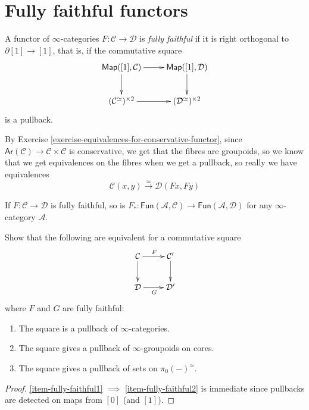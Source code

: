 \section{Fully faithful functors}
\label{section-fully-faithful-functors}

\begin{definition}
\label{definition-fully-faithful}
A functor of $\infty$-categories $F:\mathcal{C} \to \mathcal{D}$ 
is {\it fully faithful} if it is
right orthogonal to $\partial[1] \to [1]$,
that is, if the commutative square
$$
\xymatrix{
\mathsf{Map}([1],\mathcal{C})\ar[r]\ar[d]&
\mathsf{Map}([1],\mathcal{D})\ar[d]\\
(\mathcal{C}^\simeq)^{\times 2}\ar[r]&
(\mathcal{D}^\simeq)^{\times 2}
}
$$
is a pullback.
\end{definition}

By Exercise \ref{exercise-equivalences-for-conservative-functor}, since 
$\mathsf{Ar}(\mathcal{C})\to \mathcal{C}\times\mathcal{C}$
is conservative, we get that the fibres
are groupoids, so we know that we get equivalences
on the fibres when we get a pullback, so really we have
equivalences
$$
\mathcal{C}(x,y)\xrightarrow{\simeq}\mathcal{D}(Fx,Fy)
$$


\begin{lemma}
\label{lemma-fully-faithfulness-is-preserved-by-Fun(A,-)}
If $F:\mathcal{C} \to \mathcal{D}$ is fully faithful,
so is
$F_*:
\mathsf{Fun}(\mathcal{A},\mathcal{C})\to\mathsf{Fun}(\mathcal{A},\mathcal{D})$ 
for any $\infty$-category $\mathcal{A}$.
\end{lemma}

\begin{exercise}
\label{exercise-characterization-of-pullbacks-for-fully-faithful}
Show that the following are equivalent for a commutative square
$$
\xymatrix{
\mathcal{C}\ar[r]^F\ar[d]&\mathcal{C}'\ar[d]\\
\mathcal{D}\ar[r]_G&\mathcal{D}'
}
$$
where $F$ and $G$ are fully faithful:
\begin{enumerate}
\item The square is a pullback of $\infty$-categories.
\label{item-fully-faithful1}

\item The square gives a pullback of $\infty$-groupoids on cores.
\label{item-fully-faithful2}

\item The square gives a pullback of sets on $\pi_0(-)^\simeq$.
\label{item-fully-faithful3}
\end{enumerate} 
\end{exercise}

\begin{proof}
\ref{item-fully-faithful1} $\implies$ \ref{item-fully-faithful2}
is immediate since pullbacks are detected on maps from $[0]$ 
(and $[1]$).
\end{proof}

\label{section-}




